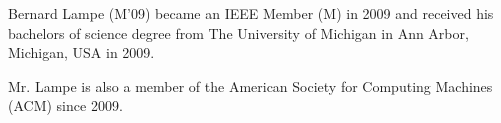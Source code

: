 \documentclass[journal]{IEEEtran}
\begin{document}



\begin{IEEEbiographynophoto}{Bernard Lampe}
(M'09) became an IEEE Member (M) in 2009 and received his bachelors of science degree from The University of Michigan in Ann Arbor, Michigan, USA in 2009.
\par Mr. Lampe is also a member of the American Society for Computing Machines (ACM) since 2009.
\end{IEEEbiographynophoto}

\end{document}
